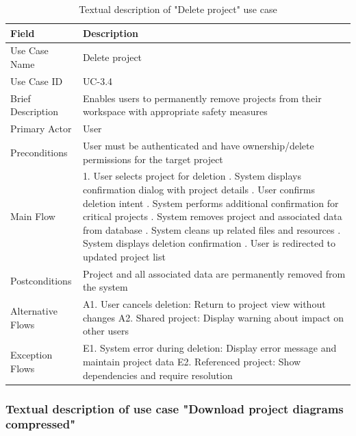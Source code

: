 \begin{table}[H]
\centering
\caption{Textual description of "Delete project" use case}
\label{tab:delete_project_usecase}
\begin{tabular}{|p{3cm}|p{10cm}|}
\hline
\textbf{Field} & \textbf{Description} \\
\hline
Use Case Name & Delete project \\
\hline
Use Case ID & UC-3.4 \\
\hline
Brief Description & Enables users to permanently remove projects from their workspace with appropriate safety measures \\
\hline
Primary Actor & User \\
\hline
Preconditions & User must be authenticated and have ownership/delete permissions for the target project \\
\hline
Main Flow & 1. User selects project for deletion \newline 2. System displays confirmation dialog with project details \newline 3. User confirms deletion intent \newline 4. System performs additional confirmation for critical projects \newline 5. System removes project and associated data from database \newline 6. System cleans up related files and resources \newline 7. System displays deletion confirmation \newline 8. User is redirected to updated project list \\
\hline
Postconditions & Project and all associated data are permanently removed from the system \\
\hline
Alternative Flows & A1. User cancels deletion: Return to project view without changes \newline A2. Shared project: Display warning about impact on other users \\
\hline
Exception Flows & E1. System error during deletion: Display error message and maintain project data \newline E2. Referenced project: Show dependencies and require resolution \\
\hline
\end{tabular}
\end{table}

\subsubsection{Textual description of use case "Download project diagrams compressed"}

